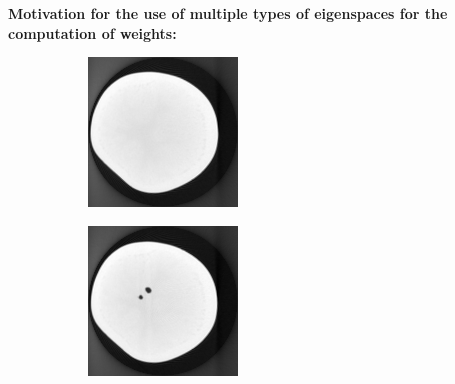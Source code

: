 \documentclass[journal]{IEEEtran}
\begin{document}
\textbf{Motivation for the use of multiple types of eigenspaces for the computation of weights:}
\begin{figure}[!h]
    \begin{subfigure}[b]{0.24\linewidth}
        \includegraphics[width=\textwidth]{../images/potato/template_1.png}
\captionsetup{labelformat=empty}       
 \caption{}
    \end{subfigure}
    \begin{subfigure}[b]{0.24\linewidth}
        \includegraphics[width=\textwidth]{../images/potato/template_2.png}

\end{subfigure}
\end{figure}
\end{document}

